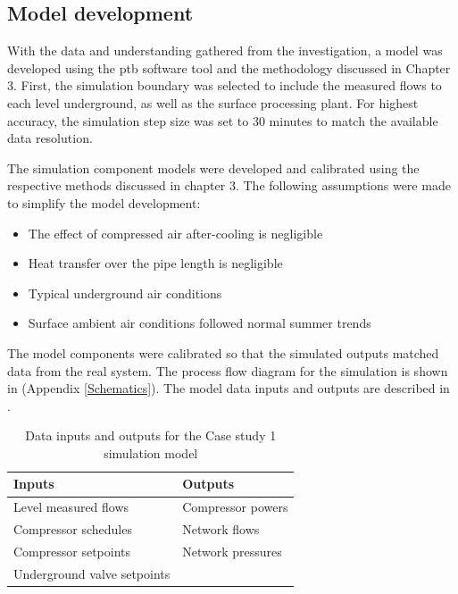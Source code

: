 \subsection{Model development}
With the data and understanding gathered from the investigation, a model was developed using the \gls{ptb} software tool and the methodology discussed in Chapter 3. First, the simulation boundary was selected to include the measured flows to each level underground, as well as the surface processing plant. For highest accuracy, the simulation step size was set to 30 minutes to match the available data resolution.
\par
The simulation component models were developed and calibrated using the respective methods discussed in chapter 3. The following assumptions were made to simplify the model development:
\begin{itemize}
	\item The effect of compressed air after-cooling is negligible
	\item Heat transfer over the pipe length is negligible
	\item Typical underground air conditions
	\item Surface ambient air conditions followed normal summer trends
\end{itemize} 
The model components were calibrated so that the simulated outputs matched data from the real system. The process flow diagram for the simulation is shown in (Appendix \ref{Schematics}). The model data inputs and outputs are described in .

\begin{table}[h!]
	\centering
	\begin{tabular}{ll}
		\hline
		Inputs \hspace*{4cm} &Outputs \hspace*{4cm} \\ \hline
		Level measured flows&Compressor powers \\
		Compressor schedules& Network flows \\
		Compressor setpoints& Network pressures \\
		Underground valve setpoints& \\
		\hline
	\end{tabular}
	\caption{Data inputs and outputs for the Case study 1 simulation model }
	\label{table: Mine A inputs/outputs}
\end{table}

